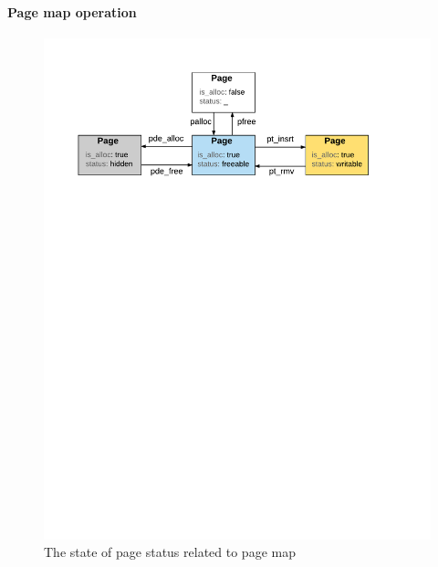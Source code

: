 \paragraph{Page map operation}

\begin{figure}[t]\centering
\includegraphics[scale=.8]{figs/page_status} 
\caption{The state of page status related to page map}
\label{fig:seq:pages}
\hrulefill
\end{figure}

